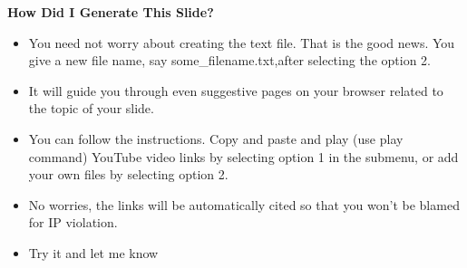 \documentclass[aspectratio=169]{beamer}
\begin{document}
\begin{frame}{\Large\textbf{How Did I Generate This Slide?}}
    \vspace{0.5em}
    \begin{itemize}
        \item You need not worry about creating the text file. That is the good news. You give a new file name, say \textcolor[RGB]{255,165,0}{some\_filename.txt},after selecting the option 2.
        \item It will guide you through even suggestive pages on your browser related to the topic of your slide.
        \item You can follow the instructions. Copy and paste  and play (use play  command) YouTube video links by selecting option 1 in the submenu, or add your own files by selecting option 2.
        \item No worries, the links will be automatically cited so that you won't be blamed for IP violation.
        \item Try it and let me know
    \end{itemize}
\end{frame}
\end{document}
